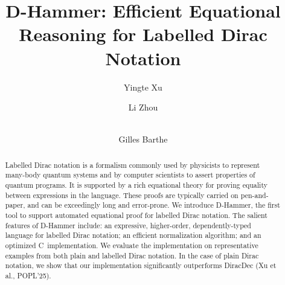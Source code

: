 \documentclass[runningheads]{llncs}
\newcommand{\CC}{C\nolinebreak\hspace{-.05em}\raisebox{.4ex}{\tiny\bf +}\nolinebreak\hspace{-.10em}\raisebox{.4ex}{\tiny\bf +}}
\def\CC{{C\nolinebreak[4]\hspace{-.05em}\raisebox{.4ex}{\tiny\bf ++}}}
\begin{document}
%
\title{D-Hammer: Efficient Equational Reasoning for Labelled Dirac Notation}
\author{}
\institute{}

%
%
\author{Yingte Xu \and
Li Zhou \and
\\
Gilles Barthe \Letter}
%
%


%
\maketitle              %
%
\begin{abstract}
    Labelled Dirac notation is a formalism commonly used by physicists to represent many-body quantum systems and by computer scientists to assert properties of quantum programs. It is supported by a rich equational theory for proving equality between expressions in the language. These proofs are typically carried on pen-and-paper, and can be exceedingly long and error-prone. We introduce D-Hammer, the first tool to support automated equational proof for labelled Dirac notation. The salient features of D-Hammer include: an expressive, higher-order, dependently-typed language for labelled Dirac notation; an efficient normalization algorithm; and an optimized \CC\ implementation. We evaluate the implementation on representative examples from both plain and labelled Dirac notation. In the case of plain Dirac notation, we show that our implementation significantly outperforms DiracDec (Xu et al., POPL'25).
  


\end{abstract}
%
%
%
\end{document}
